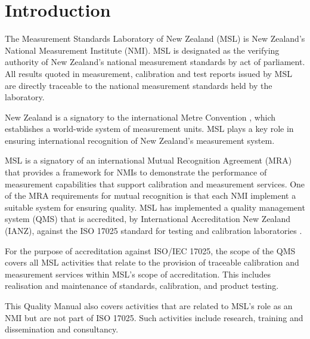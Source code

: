 \section{Introduction}
The Measurement Standards Laboratory of New Zealand (MSL) is New Zealand's National Measurement Institute (NMI). MSL is designated as the verifying authority of New Zealand's national measurement standards by act of parliament. All results quoted in measurement, calibration and test reports issued by MSL are directly traceable to the national measurement standards held by the laboratory. 

New Zealand is a signatory to the international Metre Convention \cite{Metre_convention}, which establishes a world-wide system of measurement units. 
MSL plays a key role in ensuring international recognition of New Zealand's measurement system. 

MSL is a signatory of an international Mutual Recognition Agreement (MRA) \cite{MRA_1999} that provides a framework for NMIs to demonstrate the performance of measurement capabilities that support calibration and measurement services. One of the MRA requirements for mutual recognition is that each NMI implement a suitable system for ensuring quality. MSL has implemented a quality management system (QMS) that is accredited, by International Accreditation New Zealand (IANZ), against the ISO 17025 standard for testing and calibration laboratories \cite{ISO_17025}. 

For the purpose of accreditation against ISO/IEC 17025, the scope of the QMS covers all MSL activities that relate to the provision of traceable calibration and measurement services within MSL's scope of accreditation.  This includes realisation and maintenance of standards, calibration, and product testing. 

This Quality Manual also covers activities that are related to MSL's role as an NMI but are not part of ISO 17025.  Such activities include research, training and dissemination and consultancy.